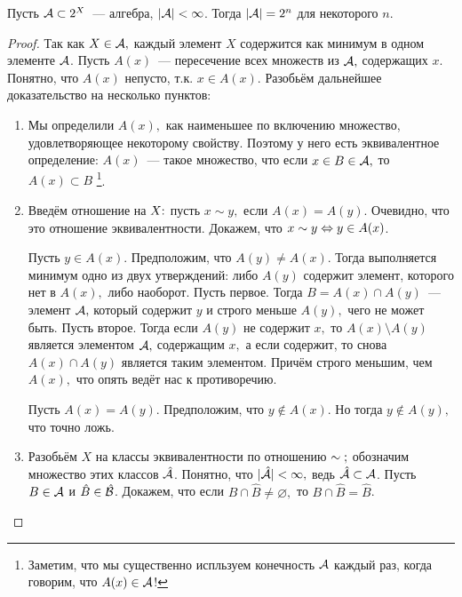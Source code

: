 \documentclass{notes}
\begin{document}
	\begin{exc}
		Пусть $\mathcal{A} \subset 2^X$~--- алгебра, $|\mathcal{A}| < \infty$. Тогда $|\mathcal{A}| = 2^n$ для некоторого $n$.
		\begin{proof}
			Так как $X \in \mathcal{A},$ каждый элемент $X$ содержится как минимум в одном элементе $\mathcal{A}$. Пусть $A(x)$~--- пересечение всех множеств из $\mathcal{A},$ содержащих $x$. Понятно, что $A(x)$ непусто, т.к. $x \in A(x)$. Разобьём дальнейшее доказательство на несколько пунктов:
			\begin{enumerate}
				\item Мы определили $A(x),$ как наименьшее по включению множество, удовлетворяющее некоторому свойству. Поэтому у него есть эквивалентное определение: $A(x)$~--- такое множество, что если $x \in B \in \mathcal{A},$ то $A(x) \subset B$ \footnote{Заметим, что мы существенно испльзуем конечность $\mathcal{A}$ каждый раз, когда говорим, что $A(x) \in \mathcal{A}$!}.
				\item Введём отношение на $X\text{\text{:}}$ пусть $x \sim y,$ если $A(x) = A(y)$. Очевидно, что это отношение эквивалентности. Докажем, что $x \sim y \Leftrightarrow y \in A(x)$.

				Пусть $y \in A(x)$. Предположим, что $A(y) \neq A(x)$. Тогда выполняется минимум одно из двух утверждений: либо $A(y)$ содержит элемент, которого нет в $A(x),$ либо наоборот. Пусть первое. Тогда $B = A(x) \cap A(y)$~--- элемент $\mathcal{A},$ который содержит $y$ и строго меньше $A(y),$ чего не может быть. Пусть второе. Тогда если $A(y)$ не содержит $x,$ то $A(x) \setminus A(y)$ является элементом $\mathcal{A},$ содержащим $x,$ а если содержит, то снова $A(x) \cap A(y)$ является таким элементом. Причём строго меньшим, чем $A(x),$ что опять ведёт нас к противоречию.

				Пусть $A(x) = A(y)$. Предположим, что $y \notin A(x)$. Но тогда $y \notin A(y),$ что точно ложь.
				\item Разобьём $X$ на классы эквивалентности по отношению $\sim\text{\text{;}}$ обозначим множество этих классов $\hat{\mathcal{A}}$. Понятно, что $|\hat{\mathcal{A}}| < \infty,$ ведь $\hat{\mathcal{A}} \subset \mathcal{A}$. Пусть $B \in \mathcal{A}$ и $\hat{B} \in \hat{\mathcal{B}}$. Докажем, что если $B \cap \hat{B} \neq \varnothing,$ то $B \cap \hat{B} = \hat{B}$.


\end{enumerate}
\end{proof}
\end{exc}
\end{document}
